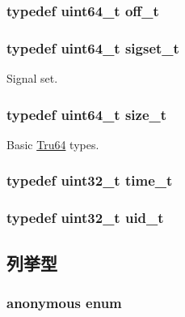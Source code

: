 \label{classTru64_a772a435921844488d52ef4df39b3e702}
\hypertarget{classTru64_a2cb84cf5f02a29b7e8f237ff151a9225}{
\subsubsection[{off\_\-t}]{\setlength{\rightskip}{0pt plus 5cm}typedef uint64\_\-t {\bf off\_\-t}}}
\label{classTru64_a2cb84cf5f02a29b7e8f237ff151a9225}
\hypertarget{classTru64_ae770e87ab143e8ad7feaf75b78a89718}{
\subsubsection[{sigset\_\-t}]{\setlength{\rightskip}{0pt plus 5cm}typedef uint64\_\-t {\bf sigset\_\-t}}}
\label{classTru64_ae770e87ab143e8ad7feaf75b78a89718}


Signal set. \hypertarget{classTru64_a186ea1339bffb378854987065835afe3}{
\subsubsection[{size\_\-t}]{\setlength{\rightskip}{0pt plus 5cm}typedef uint64\_\-t {\bf size\_\-t}}}
\label{classTru64_a186ea1339bffb378854987065835afe3}


Basic \hyperlink{classTru64}{Tru64} types. \hypertarget{classTru64_a3346b04b0420b32ccf6b706551b70762}{
\subsubsection[{time\_\-t}]{\setlength{\rightskip}{0pt plus 5cm}typedef {\bf uint32\_\-t} {\bf time\_\-t}}}
\label{classTru64_a3346b04b0420b32ccf6b706551b70762}
\hypertarget{classTru64_af2306308627701b66dc6f3babe821ab4}{
\subsubsection[{uid\_\-t}]{\setlength{\rightskip}{0pt plus 5cm}typedef {\bf uint32\_\-t} {\bf uid\_\-t}}}
\label{classTru64_af2306308627701b66dc6f3babe821ab4}


\subsection{列挙型}
\hypertarget{classTru64_a68c01102755fc7d1c810bb0b0635fa90}{
\subsubsection[{"@72}]{\setlength{\rightskip}{0pt plus 5cm}anonymous enum}}
\label{classTru64_a68c01102755fc7d1c810bb0b0635fa90}


